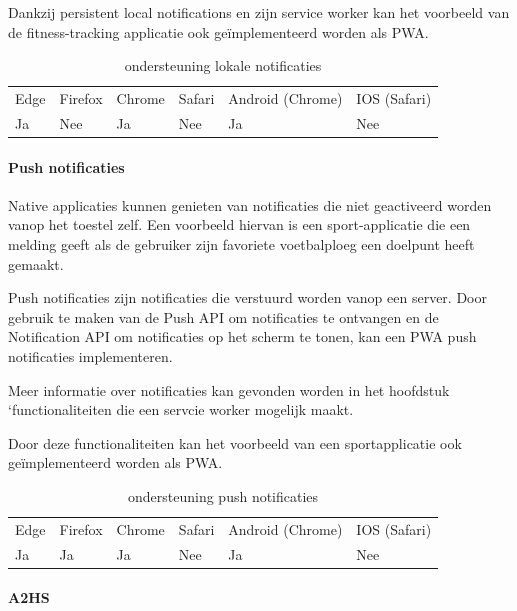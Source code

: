 Dankzij persistent local notifications en zijn service worker kan het voorbeeld van de fitness-tracking applicatie ook geïmplementeerd worden als PWA.

\begin{table}[H]
	\centering
	\begin{tabular}{llllll}
		Edge & Firefox & Chrome & Safari & Android (Chrome) & IOS (Safari) \\
		Ja   & Nee      &  Ja     & Nee     & Ja               & Nee          
	\end{tabular}	
	\caption{ondersteuning lokale notificaties }
\end{table}

\paragraph{Push notificaties}

Native applicaties kunnen genieten van notificaties die niet geactiveerd worden vanop het toestel zelf. Een voorbeeld hiervan is een sport-applicatie die een melding geeft als de gebruiker zijn favoriete voetbalploeg een doelpunt heeft gemaakt.

Push notificaties zijn notificaties die verstuurd worden vanop een server. Door gebruik te maken van de Push API \autocite{Sullivan2020} om notificaties te ontvangen en de Notification API om notificaties op het scherm te tonen, kan een PWA push notificaties implementeren. 

Meer informatie over notificaties kan gevonden worden in het hoofdstuk ‘functionaliteiten die een servcie worker mogelijk maakt.

Door deze functionaliteiten kan het voorbeeld van een sportapplicatie ook geïmplementeerd worden als PWA.

\begin{table}[H]
	\centering
	\begin{tabular}{llllll}
		Edge & Firefox & Chrome & Safari & Android (Chrome) & IOS (Safari) \\
		Ja   & Ja      &  Ja     & Nee     & Ja               & Nee          
	\end{tabular}	
	\caption{ondersteuning push notificaties }
\end{table}



\paragraph{A2HS}


